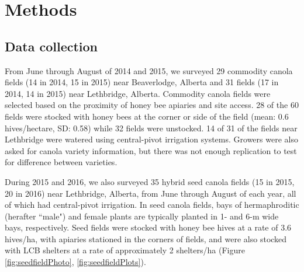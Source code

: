 \documentclass[12pt]{article} %
\begin{document}
\section{Methods}

\subsection{Data collection}
From June through August of 2014 and 2015, we surveyed 29 commodity canola fields (14 in 2014, 15 in 2015) near Beaverlodge, Alberta and 31 fields (17 in 2014, 14 in 2015) near Lethbridge, Alberta.
Commodity canola fields were selected based on the proximity of honey bee apiaries and site access. 
28 of the 60 fields were stocked with honey bees at the corner or side of the field (mean: 0.6 hives/hectare, SD: 0.58) while 32 fields were unstocked. %
14 of 31 of the fields near Lethbridge were watered using central-pivot irrigation systems.
Growers were also asked for canola variety information, but there was not enough replication to test for difference between varieties.

During 2015 and 2016, we also surveyed 35 hybrid seed canola fields (15 in 2015, 20 in 2016) near Lethbridge, Alberta, from June through August of each year, all of which had central-pivot irrigation.
In seed canola fields, bays of hermaphroditic (herafter ``male") and female plants are typically planted in 1- and 6-m wide bays, respectively. 
Seed fields were stocked with honey bee hives at a rate of 3.6 hives/ha, with apiaries stationed in the corners of fields, and were also stocked with LCB shelters at a rate of approximately 2 shelters/ha (Figure \ref{fig:seedfieldPhoto}, \ref{fig:seedfieldPlots}). %
\end{document}
